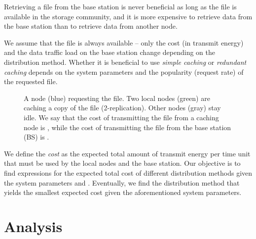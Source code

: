 \documentclass[10pt,conference]{IEEEtran}
\begin{document}
Retrieving a file from the base station is never beneficial as long as
the file is available in the storage community, and it is more
expensive to retrieve data from the base station than to retrieve data from another
node. 

We assume that the file is always available -- only the cost (in
transmit energy) and the data traffic load on the base station change
depending on the distribution method. Whether it is beneficial to use
\emph{simple caching} or \emph{redundant caching} depends on the
system parameters and the popularity (request rate) of the requested file.

\begin{figure}[htb]
\caption{A node (blue) requesting the file. Two local nodes (green) are caching a copy of the file (2-replication). Other nodes (gray) stay idle. We say that the cost of transmitting the file from a caching node is , while the cost of transmitting the file from the base station (BS) is .}
\label{BS}
\end{figure}
We define the \emph{cost} as the expected total amount of transmit energy per time unit that must be used by the local nodes and the base station. Our objective is to find expressions for the expected total cost of different distribution methods given the system parameters  and . Eventually, we find the distribution method that yields the smallest expected cost given the aforementioned system parameters.

\section{Analysis}\label{analysissec}
\end{document}
